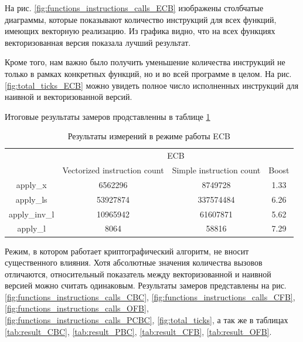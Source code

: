 \documentclass[a4paper, 12pt]{article}
\begin{document}
    На рис. \ref{fig:functions_instructions_calls_ECB} изображены столбчатые  диаграммы, которые показывают количество инструкций для всех 
    функций, имеющих векторную реализацию. Из графика видно, что на всех функциях векторизованная версия показала лучший результат.

    Кроме того, нам важно было получить уменьшение количества инструкций не только в рамках 
    конкретных функций, но и во всей программе в целом. На рис. \ref{fig:total_ticks_ECB} можно 
    увидеть полное число исполненных инструкций для наивной и 
    векторизованной версий.

    Итоговые результаты замеров продставленны в таблице \ref{tab:result_ECB}

    \begin{table}[h!]
    \begin{center}
    \begin{tabular}{|c|ccc|}
    \hline
    \multirow{2}{*}{} & \multicolumn{3}{c|}{ECB}                                                                                  \\ \cline{2-4} 
                      & \multicolumn{1}{c|}{Vectorized instruction count} & \multicolumn{1}{c|}{Simple instruction count} & Boost \\ \hline
    apply\_x          & \multicolumn{1}{c|}{6562296}                      & \multicolumn{1}{c|}{8749728}                  & 1.33  \\ \hline
    apply\_ls         & \multicolumn{1}{c|}{53927874}                     & \multicolumn{1}{c|}{337574484}                & 6.26  \\ \hline
    apply\_inv\_l     & \multicolumn{1}{c|}{10965942}                     & \multicolumn{1}{c|}{61607871}                 & 5.62  \\ \hline
    apply\_l          & \multicolumn{1}{c|}{8064}                         & \multicolumn{1}{c|}{58816}                    & 7.29  \\ \hline
    \end{tabular}
    \end{center}
    \caption{Результаты измерений в режиме работы ECB}
    \label{tab:result_ECB}
    \end{table}

    Режим, в котором работает криптографический алгоритм, не вносит существенного влияния. Хотя абсолютные значения количества вызовов
    отличаются, относительный показатель между векторизованной и наивной версией можно считать одинаковым. Результаты замеров 
    представлены на рис. \ref{fig:functions_instructions_calls_CBC}, \ref{fig:functions_instructions_calls_CFB}, 
    \ref{fig:functions_instructions_calls_OFB}, \ref{fig:functions_instructions_calls_PCBC}, \ref{fig:total_ticks}, а так же в таблицах 
    \ref{tab:result_CBC}, \ref{tab:result_PBC}, \ref{tab:result_CFB}, \ref{tab:result_OFB}.
\end{document}
